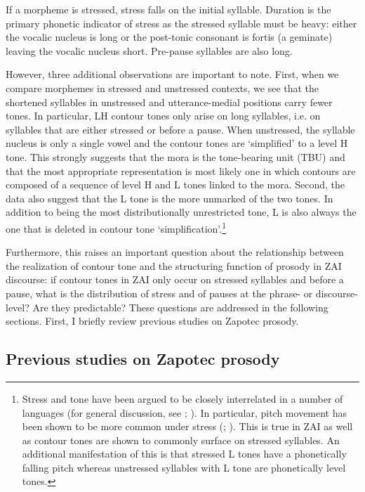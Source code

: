 If a morpheme is stressed, stress falls on the initial syllable. Duration is the primary phonetic indicator of stress as the stressed syllable must be heavy: either the vocalic nucleus is long or the post-tonic consonant is fortis (a geminate) leaving the vocalic nucleus short. Pre-pause syllables are also long.

However, three additional observations are important to note. First, when we compare morphemes in stressed and unstressed contexts, we see that the shortened syllables in unstressed and utterance-medial positions carry fewer tones. In particular, LH contour tones only arise on long syllables, i.e. on syllables that are either stressed or before a pause. When unstressed, the syllable nucleus is only a single vowel and the contour tones are `simplified' to a level H tone. This strongly suggests that the mora is the tone-bearing unit (TBU) and that the most appropriate representation is most likely one in which contours are composed of a sequence of level H and L tones linked to the mora. Second, the data also suggest that the L tone is the more unmarked of the two tones. In addition to being the most distributionally unrestricted tone, L is also always the one that is deleted in contour tone `simplification'.\footnote{Stress and tone have been argued to be closely interrelated in a number of languages (for general discussion, see \citealt{yip2002}; \citealt{zhang2002}). In particular, pitch movement has been shown to be more common under stress (\citealt{zhang2002};  \citealt{zoll2003}). This is true in ZAI as well as contour tones are shown to commonly surface on stressed syllables. An additional manifestation of this is that stressed L tones have a phonetically falling pitch whereas unstressed syllables with L tone are phonetically level tones.} 

Furthermore, this raises an important question about the relationship between the realization of contour tone and the structuring function of prosody in ZAI discourse: if contour tones in ZAI only occur on stressed syllables and before a pause, what is the distribution of stress and of pauses at the phrase- or discourse-level? Are they predictable? These questions are addressed in the following sections. First, I briefly review previous studies on Zapotec prosody.


\subsection{Previous studies on Zapotec prosody}

